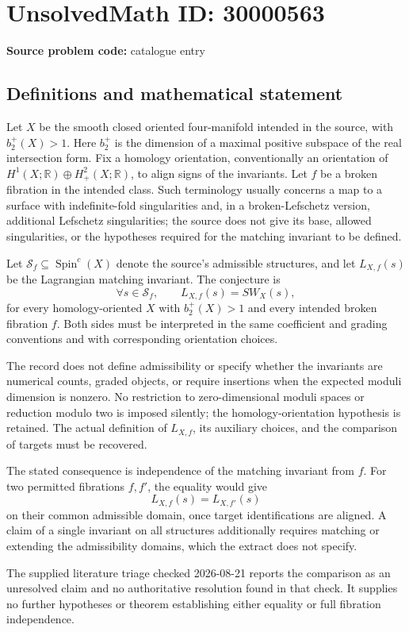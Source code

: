 \documentclass[11pt]{article}
\newcommand{\R}{\mathbb{R}}
\begin{document}
\section*{UnsolvedMath ID: 30000563}
\textbf{Source problem code:} catalogue entry
\subsection{Definitions and mathematical statement}
Let \(X\) be the smooth closed oriented four-manifold intended in the source, with \(b_2^+(X)>1\). Here \(b_2^+\) is the dimension of a maximal positive subspace of the real intersection form. Fix a homology orientation, conventionally an orientation of \(H^1(X;\R)\oplus H^2_+(X;\R)\), to align signs of the invariants. Let \(f\) be a broken fibration in the intended class. Such terminology usually concerns a map to a surface with indefinite-fold singularities and, in a broken-Lefschetz version, additional Lefschetz singularities; the source does not give its base, allowed singularities, or the hypotheses required for the matching invariant to be defined.

Let \(\mathcal S_f\subseteq\operatorname{Spin}^c(X)\) denote the source's admissible structures, and let \(L_{X,f}(s)\) be the Lagrangian matching invariant. The conjecture is
\[
\forall s\in\mathcal S_f,\qquad
L_{X,f}(s)=SW_X(s),
\]
for every homology-oriented \(X\) with \(b_2^+(X)>1\) and every intended broken fibration \(f\). Both sides must be interpreted in the same coefficient and grading conventions and with corresponding orientation choices.

The record does not define admissibility or specify whether the invariants are numerical counts, graded objects, or require insertions when the expected moduli dimension is nonzero. No restriction to zero-dimensional moduli spaces or reduction modulo two is imposed silently; the homology-orientation hypothesis is retained. The actual definition of \(L_{X,f}\), its auxiliary choices, and the comparison of targets must be recovered.

The stated consequence is independence of the matching invariant from \(f\). For two permitted fibrations \(f,f'\), the equality would give
\[
L_{X,f}(s)=L_{X,f'}(s)
\]
on their common admissible domain, once target identifications are aligned. A claim of a single invariant on all structures additionally requires matching or extending the admissibility domains, which the extract does not specify.

The supplied literature triage checked 2026-08-21 reports the comparison as an unresolved claim and no authoritative resolution found in that check. It supplies no further hypotheses or theorem establishing either equality or full fibration independence.
\end{document}
